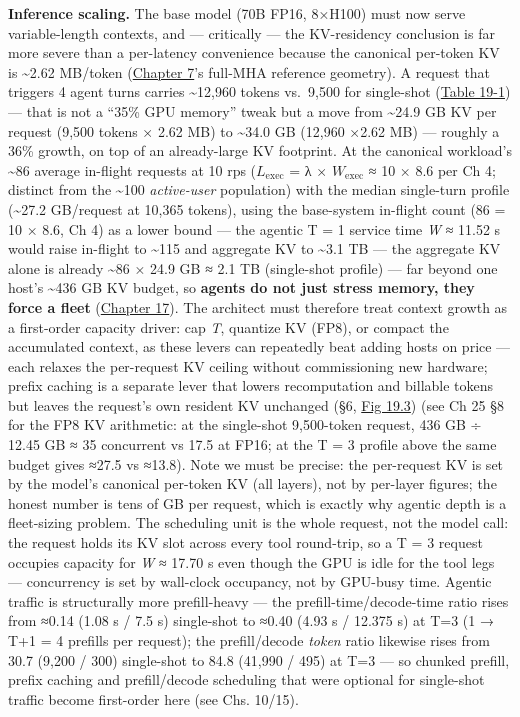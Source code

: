 \textbf{Inference scaling.} The base model (70B FP16, 8×H100) must now
serve variable-length contexts, and --- critically --- the KV-residency
conclusion is far more severe than a per-latency convenience because the
canonical per-token KV is \textasciitilde2.62 MB/token (\hyperref[chap:7]{Chapter 7}'s
full-MHA reference geometry). A request that triggers 4 agent turns
carries \textasciitilde12,960 tokens vs.~9,500 for single-shot (\hyperref[tab:19.1]{Table 19-1}) --- that is not a ``35\% GPU memory'' tweak but a move from
\textasciitilde24.9 GB KV per request (9,500 tokens × 2.62 MB) to
\textasciitilde34.0 GB (12,960 ×2.62 MB) --- roughly a 36\% growth, on
top of an already-large KV footprint. At the canonical workload's
\textasciitilde86 average in-flight requests at 10 rps
(\(L_{\mathrm{exec}}\) = λ × \(W_{\mathrm{exec}}\) ≈ 10 × 8.6 per Ch 4;
distinct from the \textasciitilde100 \emph{active-user} population) with
the median single-turn profile (\textasciitilde27.2 GB/request at 10,365
tokens), using the base-system in-flight count (86 = 10 × 8.6, Ch 4) as
a lower bound --- the agentic T = 1 service time \emph{W} ≈ 11.52 s
would raise in-flight to \textasciitilde115 and aggregate KV to
\textasciitilde3.1 TB --- the aggregate KV alone is already
\textasciitilde86 × 24.9 GB ≈ 2.1 TB (single-shot profile) --- far
beyond one host's \textasciitilde436 GB KV budget, so \textbf{agents do
not just stress memory, they force a fleet} (\hyperref[chap:17]{Chapter 17}). The architect
must therefore treat context growth as a first-order capacity driver:
cap \emph{T}, quantize KV (FP8), or compact the accumulated context, as
these levers can repeatedly beat adding hosts on price --- each relaxes
the per-request KV ceiling without commissioning new hardware; prefix
caching is a separate lever that lowers recomputation and billable
tokens but leaves the request's own resident KV unchanged (§6, \hyperref[fig:19.3]{Fig 19.3})
(see Ch 25 §8 for the FP8 KV arithmetic: at the single-shot 9,500-token
request, 436 GB ÷ 12.45 GB ≈ 35 concurrent vs 17.5 at FP16; at the T = 3
profile above the same budget gives ≈27.5 vs ≈13.8). Note we must be
precise: the per-request KV is set by the model's canonical per-token KV
(all layers), not by per-layer figures; the honest number is tens of GB
per request, which is exactly why agentic depth is a fleet-sizing
problem. The scheduling unit is the whole request, not the model call:
the request holds its KV slot across every tool round-trip, so a T = 3
request occupies capacity for \emph{W} ≈ 17.70 s even though the GPU is
idle for the tool legs --- concurrency is set by wall-clock occupancy,
not by GPU-busy time. Agentic traffic is structurally more prefill-heavy
--- the prefill-time/decode-time ratio rises from ≈0.14 (1.08 s / 7.5 s)
single-shot to ≈0.40 (4.93 s / 12.375 s) at T=3 (1 → T+1 = 4 prefills
per request); the prefill/decode \emph{token} ratio likewise rises from
30.7 (9,200 / 300) single-shot to 84.8 (41,990 / 495) at T=3 --- so
chunked prefill, prefix caching and prefill/decode scheduling that were
optional for single-shot traffic become first-order here (see Chs.
10/15).

